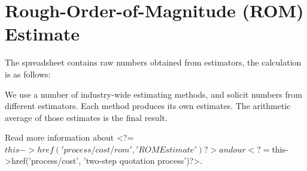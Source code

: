 
\section*{Rough-Order-of-Magnitude (ROM) Estimate}

The spreadsheet contains raw numbers obtained from estimators, the calculation is as follows:


We use a number of industry-wide estimating methods, and solicit numbers from different
estimators. Each method produces its own estimates. The arithmetic average of those estimates 
is the final result.


Read more information about <?=$this->href('process/cost/rom', 'ROM Estimate')?> 
and our <?=$this->href('process/cost', 'two-step quotation process')?>.
